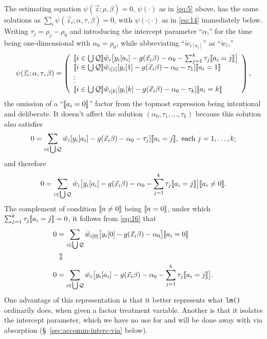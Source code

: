 \documentclass{article}
\DeclarePairedDelimiter{\indicator}{\llbracket}{\rrbracket}
\newcommand{\owt}[1][{[a_i]}]{\ensuremath{\check{w}_{i#1}}}
\begin{document}
The estimating equation $\psi(\vec{z}; \rho, \beta)=0$,
$\psi(\cdot)$ as in \eqref{eq:5} above, has the same solutions as $\sum_{i}\psi(\vec{z}_{i};
  \alpha, \tau, \beta)=0$, with $\psi(\cdot; \cdot)$ as in \eqref{eq:14} immediately below.  Writing $\tau_{j}=\rho_{j}-\rho_{0}$ and introducing the intercept parameter ``$\alpha$,''  for the time being one-dimensional with $\alpha_{0}=\rho_{0}$, while abbreviating ``$\owt{}$'' as ``$\owt[]$,'' 
\begin{equation} \label{eq:14}
         \psi(\vec{z}_{i};
  \alpha, \tau, \beta) =
         \left( \begin{array}{l}
           \indicator{i \in \bigcup \mathcal{Q}}\owt[] \big[y_{i}[a_{i}] - g(\vec{x}_{i}\beta)-
                  \alpha_{0} - \sum_{j=1}^{k}\tau_{j}\indicator{a_{i}=j}\big]\\
           \indicator{i \in \bigcup \mathcal{Q}}\owt[{[1]}] [y_{i}[1] - g(\vec{x}_{i}\beta)-
                  \alpha_{0}-\tau_{1}]\indicator{a_{i}=1}\\
                  \vdots \\
           \indicator{i \in \bigcup \mathcal{Q}}\owt[{[k]}] [y_{i}[k] - g(\vec{x}_{i}\beta)-
                 \alpha_{0} - \tau_{k}]\indicator{a_{i}=k}\\
                \end{array}\right), 
\end{equation}
the omission of a ``$\indicator{a_{i}=0}$'' factor from the topmost
expression being intentional and deliberate. It doesn't affect the solution
$(\alpha_{0}, \tau_{1}, \ldots, \tau_{k})$ because this solution also satisfies
\begin{equation} \label{eq:16}
       0 = \sum_{i \in \bigcup \mathcal{Q}}\owt[][y_{i}[a_i] - g(\vec{x}_{i}\beta)-
                  \alpha_{0}-\tau_{j}]\indicator{a_{i}=j}, \text{ each } j=1, \ldots, k;
\end{equation}
and therefore
\begin{equation*}
       0 = \sum_{i \in \bigcup \mathcal{Q}}\owt[]\big[y_{i}[a_i] - g(\vec{x}_{i}\beta)-
                  \alpha_{0}-\sum_{j=1}^{k}\tau_{j}\indicator{a_{i}=j}\big]\indicator{a_{i}
                  \neq 0}.
\end{equation*}
The complement of condition $\indicator{a\neq 0}$ being
$\indicator{a=0}$, under which
$\sum_{j=1}^{k}\tau_{j}\indicator{a_{i}=j}=0$, it follows from \eqref{eq:16} that
\begin{align*}
         0 &= \sum_{i \in \bigcup \mathcal{Q}}\owt[{[0]}]\big[y_{i}[0] - g(\vec{x}_{i}\beta)-
                  \alpha_{0}\big]\indicator{a_{i}
             =0}\\
           & \Updownarrow \\
         0 &= \sum_{i \in \bigcup \mathcal{Q}}\owt[]\big[y_{i}[a_i] - g(\vec{x}_{i}\beta)-
                  \alpha_{0} - \sum_{j=1}^{k}\tau_{j}\indicator{a_{i}=j}\big].
\end{align*}
One advantage of this representation is that it better represents what
\texttt{lm()} ordinarily does, when given a factor treatment
variable.  Another is that it isolates the intercept parameter, which
we have no use for and will be done away with via absorption (\S~\ref{sec:accomm-interc-via} below). 
\end{document}
